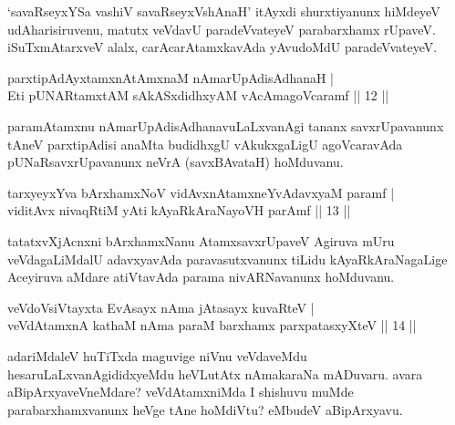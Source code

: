 \begin{artha}
`savaRseyxYSa vashiV savaRseyxVshAnaH' itAyxdi shurxtiyanunx hiMdeyeV
udAharisiruvenu, matutx veVdavU paradeVvateyeV parabarxhamx rUpaveV. 
iSuTxmAtarxveV alalx, carAcarAtamxkavAda yAvudoMdU paradeVvateyeV.
\end{artha}


\begin{shl}
parxtipAdAyx\s \s tamxnA\s \s tAmxnaM nAmarUpAdisAdhanaH | \\
Eti pUNARtamxtAM sAkASxdidhxyAM vAcAmagoVcaramf \hfill||  12 ||  
\end{shl}

\begin{artha}
paramAtamxnu nAmarUpAdisAdhanavuLaLxvanAgi tananx savxrUpavanunx 
tAneV parxtipAdisi anaMta budidhxgU vAkukxgaLigU agoVcaravAda 
pUNaRsavxrUpavanunx neVrA (savxBAvataH) hoMduvanu.
\end{artha}

\begin{shl}
tarxyeyxYva bArxhamxNoV vidAvxnAtamxneYvAdavxyaM paramf | \\
viditAvx nivaqRtiM yAti kAyaRkAraNayoVH parAmf \hfill||  13 ||  
\end{shl}

\begin{artha}
tatatxvXjAcnxni bArxhamxNanu AtamxsavxrUpaveV Agiruva mUru 
veVdagaLiMdalU adavxyavAda paravasutxvanunx tiLidu kAyaRkAraNagaLige 
Aceyiruva aMdare atiVtavAda parama nivARNavanunx hoMduvanu.
\end{artha}


\begin{shl}
veVdoV\s siVtayxta EvAsayx nAma jAtasayx kuvaRteV | \\
veVdAtamxnA kathaM nAma paraM barxhamx parxpatasxyXteV \hfill||  14 ||  
\end{shl}

\begin{artha}
adariMdaleV huTiTxda maguvige niVnu veVdaveMdu 
hesaruLaLxvanAgididxyeMdu heVLutAtx nAmakaraNa mADuvaru. avara 
aBipArxyaveVneMdare? veVdAtamxniMda I shishuvu muMde 
parabarxhamxvanunx heVge tAne hoMdiVtu? eMbudeV aBipArxyavu.
\end{artha}


